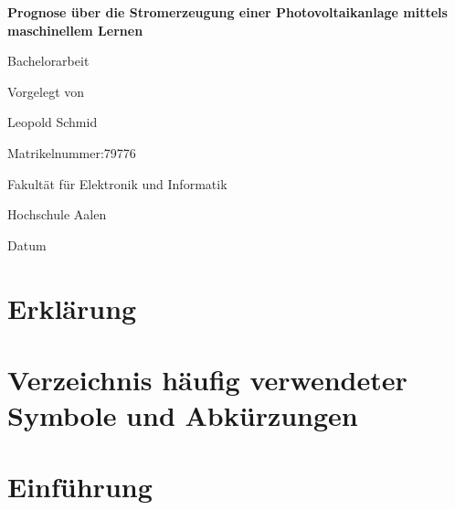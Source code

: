 \documentclass[12pt, a4paper]{article}
\begin{document}
\begin{titlepage}
    \begin{center}
        \vspace*{1cm}
        
        \textbf{\LARGE{Prognose über die Stromerzeugung einer Photovoltaikanlage mittels maschinellem Lernen}}
        
        \vspace{0.5cm}
        \Large{Bachelorarbeit}
        
        \vspace{1.5cm}
        \Large{Vorgelegt von}
        
        \vspace{0.5cm}
        \Large{Leopold Schmid}
        
        \vspace{1.5cm}
        \Large{Matrikelnummer:79776}
        
        \vfill
        
        \Large{Fakultät für Elektronik und Informatik}
        
        \vspace{0.5cm}
        \Large{Hochschule Aalen}
        
        \vspace{1.5cm}
        \Large{Datum}
        
    \end{center}
\end{titlepage}


\newpage

\section*{Erklärung}


\newpage


\section*{Verzeichnis häufig verwendeter Symbole und Abkürzungen}

\newpage

\tableofcontents


\newpage
\setcounter{section}{0}


\section{Einführung}

\end{document}
